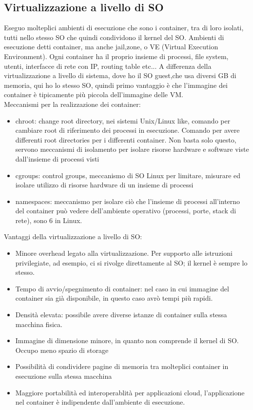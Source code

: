 \documentclass{article}
\begin{document}
\subsection{Virtualizzazione a livello di SO}
Eseguo molteplici ambienti di esecuzione che sono i container, tra di loro isolati, tutti nello stesso SO che quindi condividono il kernel del SO. Ambienti di esecuzione detti container, ma anche jail,zone, o VE (Virtual Execution Environment). Ogni container ha il proprio insieme di processi, file system, utenti, interfacce di rete con IP, routing table etc... A differenza della virtualizzazione a livello di sistema, dove ho il SO guest,che usa diversi GB di memoria, qui ho lo stesso SO, quindi primo vantaggio è che l'immagine dei container è tipicamente più piccola dell'immagine delle VM.\\ Meccanismi per la realizzazione dei container:
\begin{itemize}
\item chroot: change root directory, nei sistemi Unix/Linux like, comando per cambiare root di riferimento dei processi in esecuzione. Comando per avere differenti root directories per i differenti container. Non basta solo questo, servono meccanismi di isolamento per isolare risorse hardware e software viste dall'insieme di processi visti 
\item cgroups: control groups, meccanismo di SO Linux per limitare, misurare ed isolare utilizzo di risorse hardware di un insieme di processi
\item namespaces: meccanismo per isolare ciò che l'insieme di processi all'interno del container può vedere dell'ambiente operativo (processi, porte, stack di rete), sono 6 in Linux.
\end{itemize}
Vantaggi della virtualizzazione a livello di SO:
\begin{itemize}
\item Minore overhead legato alla virtualizzazione. Per supporto alle istruzioni privilegiate, ad esempio, ci si rivolge direttamente al SO; il kernel è sempre lo stesso.
\item Tempo di avvio/spegnimento di container: nel caso in cui immagine del container sia già disponibile, in questo caso avrò tempi più rapidi.
\item Densità elevata: possibile avere diverse istanze di container sulla stessa macchina fisica.
\item Immagine di dimensione minore, in quanto non comprende il kernel di SO. Occupo meno spazio di storage
\item Possibilità di condividere pagine di memoria tra molteplici container in esecuzione sulla stessa  macchina
\item Maggiore portabilità ed interoperablità per applicazioni cloud, l'applicazione nel container è indipendente dall'ambiente di esecuzione.
\end{itemize}
\end{document}
